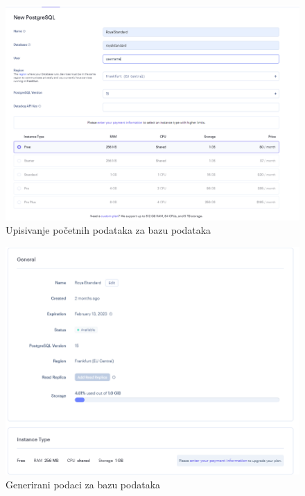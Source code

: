 		\begin{figure}[H]
			\includegraphics[width=\textwidth]{slike/OsnovniPodaciBaza.PNG} 
			\caption{Upisivanje početnih podataka za bazu podataka}
			\label{fig:Početni podaci za bazu podataka}
		\end{figure}
		
		\begin{figure}[H]
			\includegraphics[width=\textwidth]{slike/Baza1.PNG} 
			\caption{Generirani podaci za bazu podataka}
			\label{fig:Generirani podaci za bazu}
		\end{figure}
		
